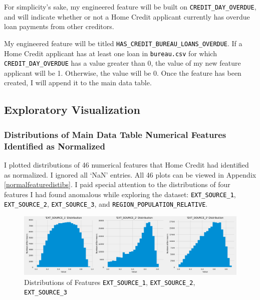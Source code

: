 \documentclass[12pt, letterpaper]{article}
\begin{document}
For simplicity's sake, my engineered feature will be built on \colorbox{backcolor}{\textcolor{black}{\texttt{CREDIT_DAY_OVERDUE}}}, and will indicate whether or not a Home Credit applicant currently has overdue loan payments from other creditors.

My engineered feature will be titled \colorbox{backcolor}{\textcolor{black}{\texttt{HAS_CREDIT_BUREAU_LOANS_OVERDUE}}}. If a Home Credit applicant has at least one loan in \colorbox{backcolor}{\textcolor{black}{\texttt{bureau.csv}}} for which \colorbox{backcolor}{\textcolor{black}{\texttt{CREDIT_DAY_OVERDUE}}} has a value greater than 0, the value of my new feature applicant will be 1. Otherwise, the value will be 0. Once the feature has been created, I will append it to the main data table.

\subsection{Exploratory Visualization}
\subsubsection{Distributions of Main Data Table Numerical Features Identified as Normalized}
I plotted distributions of 46 numerical features that Home Credit had identified as normalized. I ignored all `NaN' entries. All 46 plots can be viewed in Appendix \ref{normalfeaturedistibs}. I paid special attention to the distributions of four features I had found anomalous while exploring the dataset: \colorbox{backcolor}{\textcolor{black}{\texttt{EXT_SOURCE_1}}}, \colorbox{backcolor}{\textcolor{black}{\texttt{EXT_SOURCE_2}}}, \colorbox{backcolor}{\textcolor{black}{\texttt{EXT_SOURCE_3}}}, and \colorbox{backcolor}{\textcolor{black}{\texttt{REGION_POPULATION_RELATIVE}}}.

\begin{figure}[ht]
\includegraphics[width=\textwidth]{distribsEXTSOURCE1EXTSOURCE2EXTSOURCE3}
\centering
\caption{Distributions of Features \colorbox{backcolor}{\textcolor{black}{\texttt{EXT_SOURCE_1}}}, \colorbox{backcolor}{\textcolor{black}{\texttt{EXT_SOURCE_2}}}, \colorbox{backcolor}{\textcolor{black}{\texttt{EXT_SOURCE_3}}}}
\end{figure}
\end{document}
